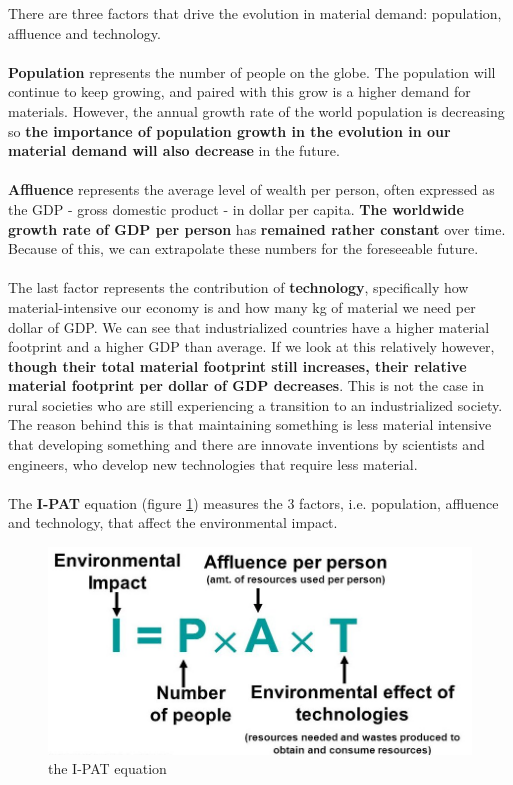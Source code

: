 \documentclass[../summary.tex]{subfiles}
\begin{document}
	There are three factors that drive the evolution in material demand: population, affluence and technology. 
	\\\\
	\textbf{Population} represents the number of people on the globe. The population will continue to keep growing, and paired with this grow is a higher demand for materials. However, the annual growth rate of the world population is decreasing so \textbf{the importance of population growth in the evolution in our material demand will also decrease} in the future.
	\\\\
	\textbf{Affluence} represents the average level of wealth per person, often expressed as the GDP - gross domestic product - in dollar per capita. \textbf{The worldwide growth rate of GDP per person} has \textbf{remained rather constant} over time. Because of this, we can extrapolate these numbers for the foreseeable future.
	\\\\
	The last factor represents the contribution of \textbf{technology}, specifically how material-intensive our economy is and how many kg of material  we need per dollar of GDP. We can see that industrialized countries have a higher material footprint and a higher GDP than average. If we look at this relatively however, \textbf{though their total material footprint still increases, their relative material footprint per dollar of GDP decreases}. This is not the case in rural societies who are still experiencing a transition to an industrialized society. The reason behind this is that maintaining something is less material intensive that developing something and there are innovate inventions by scientists and engineers, who develop new technologies that require less material. 
	\\
	\\
	The \textbf{I-PAT} equation (figure \ref{fig:ipat}) measures the 3 factors, i.e. population, affluence and technology,  that affect the environmental impact.
	\begin{figure}[H]
		\centering
		\includegraphics[width=0.7\linewidth]{../images/5-ipat}
		\caption{the I-PAT equation}
		\label{fig:ipat}
	\end{figure}
	
\end{document}
